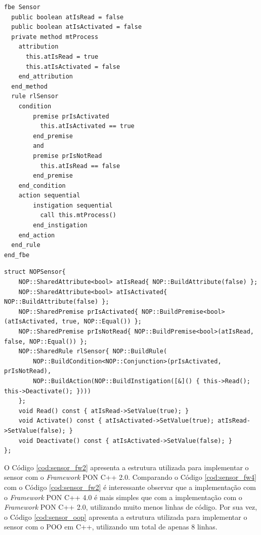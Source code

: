 \begin{lstlisting}[language=nopl, caption={\textit{FBE} \textit{Sensor} em LingPON},
  label = {cod:sensor_ex_nopl}, %float=htb,
  source = {Fonte: Autoria própria}
  ]
fbe Sensor
  public boolean atIsRead = false
  public boolean atIsActivated = false
  private method mtProcess
    attribution
      this.atIsRead = true
      this.atIsActivated = false
    end_attribution
  end_method
  rule rlSensor
    condition
        premise prIsActivated
          this.atIsActivated == true
        end_premise
        and
        premise prIsNotRead
          this.atIsRead == false
        end_premise
    end_condition
    action sequential
        instigation sequential
          call this.mtProcess()
        end_instigation
    end_action
  end_rule
end_fbe
\end{lstlisting}

\begin{lstlisting}[caption = {Código da estrutura do sensor com o \textit{Framework} PON C++ 4.0},
  source = {Autoria própria}, float=htb,
  label = {cod:sensor_fw4}]
struct NOPSensor{
    NOP::SharedAttribute<bool> atIsRead{ NOP::BuildAttribute(false) };
    NOP::SharedAttribute<bool> atIsActivated{ NOP::BuildAttribute(false) };
    NOP::SharedPremise prIsActivated{ NOP::BuildPremise<bool>(atIsActivated, true, NOP::Equal()) };
    NOP::SharedPremise prIsNotRead{ NOP::BuildPremise<bool>(atIsRead, false, NOP::Equal()) };
    NOP::SharedRule rlSensor{ NOP::BuildRule(
        NOP::BuildCondition<NOP::Conjunction>(prIsActivated, prIsNotRead),
        NOP::BuildAction(NOP::BuildInstigation([&]() { this->Read(); this->Deactivate(); })))
    };
    void Read() const { atIsRead->SetValue(true); }
    void Activate() const { atIsActivated->SetValue(true); atIsRead->SetValue(false); }
    void Deactivate() const { atIsActivated->SetValue(false); }
};
\end{lstlisting}

\FloatBarrier

O Código \ref{cod:sensor_fw2} apresenta a estrutura utilizada para implementar o
sensor com o \textit{Framework} PON C++ 2.0. Comparando o Código
\ref{cod:sensor_fw4} com o Código \ref{cod:sensor_fw2} é interessante observar
que a implementação com o \textit{Framework} PON C++ 4.0 é mais simples que com
a implementação com o \textit{Framework} PON C++ 2.0, utilizando muito menos
linhas de código. Por sua vez, o Código \ref{cod:sensor_oop} apresenta a estrutura utilizada para
implementar o sensor com o POO em C++, utilizando um total de apenas 8 linhas.

